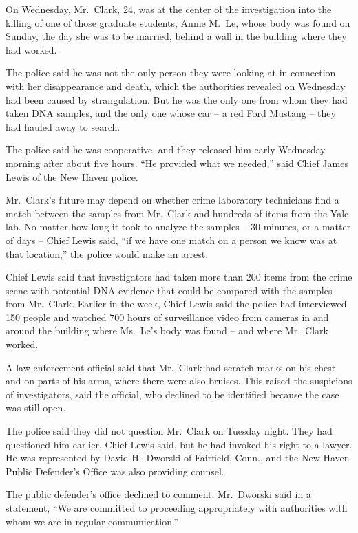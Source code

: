 ﻿\documentclass[12pt]{article}
\begin{document}
On Wednesday, Mr.~Clark, 24, was at the center of the investigation into the killing of one of those
graduate students, Annie M.~Le, whose body was found on Sunday, the day she was to be married,
behind a wall in the building where they had worked.

The police said he was not the only person they were looking at in connection with her disappearance
and death, which the authorities revealed on Wednesday had been caused by strangulation. But he was
the only one from whom they had taken DNA samples, and the only one whose car -- a red Ford Mustang
-- they had hauled away to search.

The police said he was cooperative, and they released him early Wednesday morning after about five
hours. ``He provided what we needed,'' said Chief James Lewis of the New Haven police.

Mr.~Clark's future may depend on whether crime laboratory technicians find a match between the
samples from Mr.~Clark and hundreds of items from the Yale lab. No matter how long it took to
analyze the samples -- 30 minutes, or a matter of days -- Chief Lewis said, ``if we have one match
on a person we know was at that location,'' the police would make an arrest.

Chief Lewis said that investigators had taken more than 200 items from the crime scene with
potential DNA evidence that could be compared with the samples from Mr.~Clark. Earlier in the week,
Chief Lewis said the police had interviewed 150 people and watched 700 hours of surveillance video
from cameras in and around the building where Ms.~Le's body was found -- and where Mr.~Clark worked.

A law enforcement official said that Mr.~Clark had scratch marks on his chest and on parts of his
arms, where there were also bruises. This raised the suspicions of investigators, said the official,
who declined to be identified because the case was still open.

The police said they did not question Mr.~Clark on Tuesday night. They had questioned him earlier,
Chief Lewis said, but he had invoked his right to a lawyer. He was represented by David H.~Dworski
of Fairfield, Conn., and the New Haven Public Defender's Office was also providing counsel.

The public defender's office declined to comment. Mr.~Dworski said in a statement, ``We are
committed to proceeding appropriately with authorities with whom we are in regular communication.''
\end{document}
